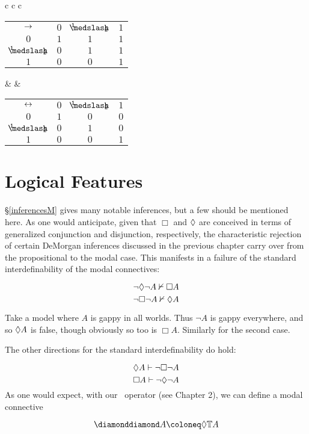 \begin{singlespace}
\begin{longtable}{c c c}
	\begin{tabular}{c | c c c}
		$\rightarrow$ & $ 0  $ & $ \oneHalf $ & $ 1  $ \\
		\cline{1-4} 
		$ 0  $ & $ 1  $ & $ 1  $ & $ 1  $ \\
		$ \oneHalf $ & $ 0  $ & $ 1  $ & $ 1  $ \\
		$ 1  $ & $ 0  $ & $ 0  $ & $ 1  $ \\
	\end{tabular}
	 & & 
	\begin{tabular}{c | c c c}
		$\leftrightarrow$ & $ 0  $ & $ \oneHalf $ & $ 1  $ \\
		\cline{1-4} 
		$ 0  $ & $ 1  $ & $ 0  $ & $ 0  $ \\
		$ \oneHalf $ & $ 0  $ & $ 1  $ & $ 0  $ \\
		$ 1  $ & $ 0  $ & $ 0  $ & $ 1  $ \\
	\end{tabular}
\end{longtable}
\end{singlespace}
\section{Logical Features}\label{logicalFeaturesM}


\S\ref{inferencesM} gives many notable inferences, but a few should be mentioned here. As one would anticipate, given that $\Box$ and $\Diamond$ are conceived in terms of generalized conjunction and disjunction, respectively, the characteristic rejection of certain DeMorgan inferences discussed in the previous chapter carry over from the propositional to the modal case. This manifests in a failure of the standard interdefinability of the modal connectives:

\[{\neg\Diamond\neg A}\nvdash{\Box A}\]
\[{\neg\Box\neg A}\nvdash{\ensuremath{\Diamond}A}\]

\noindent Take a model where $A$ is gappy in all worlds. Thus $\neg A$ is gappy everywhere, and so $\Diamond A$ is false, though obviously so too is $\Box A$. Similarly for the second case. 

The other directions for the standard interdefinability do hold:

\[{\Diamond A}\vdash{\neg\Box\neg A}\]
\[{\Box A}\vdash{\neg\ensuremath{\Diamond}\neg A}\]
As one would expect, with our \Ttrue\ operator (see Chapter 2), we can define a modal connective

\[\GDiam A\Defined \Diam\Ttrue A \]

